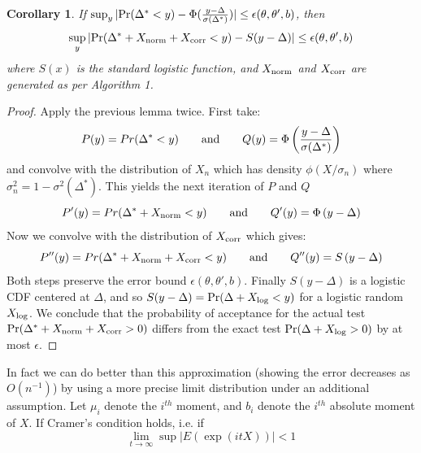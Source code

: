 \documentclass{article}
\newtheorem{corollary}{Corollary}
\begin{document}
\begin{corollary}
  If $\sup_y|{\rm Pr}(\Delta^* < y) - \Phi(\frac{y-\Delta}{\sigma(\Delta^*)})| \leq \epsilon(\theta,\theta',b)$,
  then
  \begin{equation}
    \sup_y|{\rm Pr}(\Delta^*+X_{\rm norm}+X_{\rm corr} < y) - S(y-\Delta)| \leq \epsilon(\theta,\theta',b)
  \end{equation}
  where $S(x)$ is the standard logistic function, and $X_{\rm norm}$ and $X_{\rm corr}$ are generated as per Algorithm 1. 
  \end{corollary}
\begin{proof}
  Apply the previous lemma twice. First take:
  \begin{equation}
    P(y) = Pr(\Delta^* < y) \qquad {\rm and}\qquad Q(y) = \Phi\left(\frac{y-\Delta}{\sigma(\Delta^*)}\right)
  \end{equation}
  and convolve with the distribution of $X_n$ which has density $\phi(X/\sigma_n)$ where $\sigma_n^2
  = 1 - \sigma^2(\Delta^*)$. This yields the next iteration of $P$ and $Q$
  \begin{equation}
    P'(y) = Pr(\Delta^*+X_{\rm norm} < y) \qquad {\rm and}\qquad Q'(y) = \Phi\left({y-\Delta}\right)
  \end{equation}
  Now we convolve with the distribution of $X_{\rm corr}$ which gives:
  \begin{equation}
    P''(y) = Pr(\Delta^*+X_{\rm norm}+X_{\rm corr} < y) \qquad {\rm and}\qquad Q''(y) = S\left({y-\Delta}\right)
  \end{equation}
  Both steps preserve the error bound
  $\epsilon(\theta,\theta',b)$. Finally $S(y-\Delta)$ is a logistic
  CDF centered at $\Delta$, and so $S(y-\Delta) = {\rm Pr}(\Delta +
  X_{\rm log} < y)$ for a logistic random $X_{\rm log}$. We
  conclude that the probability of acceptance for the actual test ${\rm Pr}(\Delta^*+X_{\rm norm}+X_{\rm
    corr} > 0)$ differs from the exact test ${\rm Pr}(\Delta+X_{\rm
    log} > 0)$ by at most $\epsilon$.
  
\end{proof}


In fact we can do better than this approximation (showing the error decreases as $O(n^{-1})$) by using a more
precise limit distribution under an additional assumption. Let $\mu_i$ denote the $i^{th}$ moment, and $b_i$
denote the $i^{th}$ absolute moment of $X$. If Cramer's condition holds, i.e. if
\begin{equation}
  \lim_{t \to \infty} \sup |E(\exp(i t X))| < 1
\end{equation}
\end{document}
